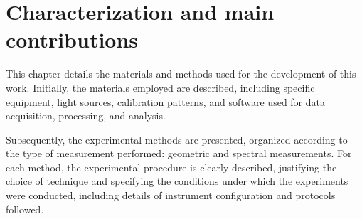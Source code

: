 \chapter{Characterization and main contributions}

This chapter details the materials and methods used for the development of this work. Initially, the materials employed are described, including specific equipment, light sources, calibration patterns, and software used for data acquisition, processing, and analysis.

Subsequently, the experimental methods are presented, organized according to the type of measurement performed: geometric and spectral measurements. For each method, the experimental procedure is clearly described, justifying the choice of technique and specifying the conditions under which the experiments were conducted, including details of instrument configuration and protocols followed.







